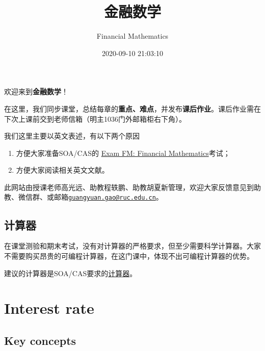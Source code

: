 \documentclass[
]{book}
\title{金融数学}
\author{Financial Mathematics}
\date{2020-09-10 21:03:10}
\begin{document}
\maketitle

{
\setcounter{tocdepth}{1}
\tableofcontents
}
\hypertarget{section}{%
\chapter*{}\label{section}}

欢迎来到\textbf{金融数学}！

在这里，我们同步课堂，总结每章的\textbf{重点、难点}，并发布\textbf{课后作业}。课后作业需在下次上课前交到老师信箱（明主1036门外邮箱柜右下角）。

我们这里主要以英文表述，有以下两个原因

\begin{enumerate}
\def\labelenumi{\arabic{enumi}.}
\item
  方便大家准备SOA/CAS的 \href{https://www.soa.org/education/exam-req/edu-exam-fm-detail/}{Exam FM: Financial Mathematics}考试；
\item
  方便大家阅读相关英文文献。
\end{enumerate}

此网站由授课老师高光远、助教程轶鹏、助教胡夏新管理，欢迎大家反馈意见到助教、微信群、或邮箱\href{mailto:guangyuan.gao@ruc.edu.cn}{\nolinkurl{guangyuan.gao@ruc.edu.cn}}。

\hypertarget{ux8ba1ux7b97ux5668}{%
\section*{计算器}\label{ux8ba1ux7b97ux5668}}

在课堂测验和期末考试，没有对计算器的严格要求，但至少需要科学计算器。大家不需要购买昂贵的可编程计算器，在这门课中，体现不出可编程计算器的优势。

建议的计算器是SOA/CAS要求的\href{https://www.soa.org/education/exam-req/exam-day-info/edu-id-calculators/}{计算器}。

\hypertarget{interest-rate}{%
\chapter{Interest rate}\label{interest-rate}}

\hypertarget{key-concepts}{%
\section{Key concepts}\label{key-concepts}}
\end{document}
